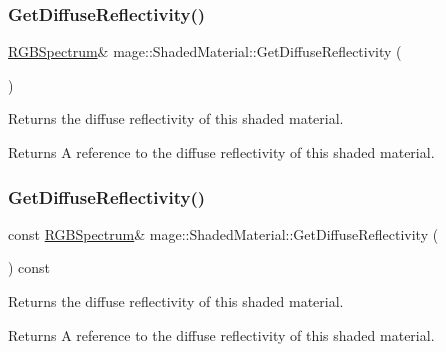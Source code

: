 \subsubsection{\texorpdfstring{Get\+Diffuse\+Reflectivity()}{GetDiffuseReflectivity()}\hspace{0.1cm}{\footnotesize\ttfamily [1/2]}}
{\footnotesize\ttfamily \hyperlink{structmage_1_1_r_g_b_spectrum}{R\+G\+B\+Spectrum}\& mage\+::\+Shaded\+Material\+::\+Get\+Diffuse\+Reflectivity (\begin{DoxyParamCaption}{ }\end{DoxyParamCaption})\hspace{0.3cm}{\ttfamily [noexcept]}}

Returns the diffuse reflectivity of this shaded material.

\begin{DoxyReturn}{Returns}
A reference to the diffuse reflectivity of this shaded material. 
\end{DoxyReturn}
\hypertarget{structmage_1_1_shaded_material_ae2c5d441c51b40a3c940785a002f59ec}{}\label{structmage_1_1_shaded_material_ae2c5d441c51b40a3c940785a002f59ec} 
\subsubsection{\texorpdfstring{Get\+Diffuse\+Reflectivity()}{GetDiffuseReflectivity()}\hspace{0.1cm}{\footnotesize\ttfamily [2/2]}}
{\footnotesize\ttfamily const \hyperlink{structmage_1_1_r_g_b_spectrum}{R\+G\+B\+Spectrum}\& mage\+::\+Shaded\+Material\+::\+Get\+Diffuse\+Reflectivity (\begin{DoxyParamCaption}{ }\end{DoxyParamCaption}) const\hspace{0.3cm}{\ttfamily [noexcept]}}

Returns the diffuse reflectivity of this shaded material.

\begin{DoxyReturn}{Returns}
A reference to the diffuse reflectivity of this shaded material. 
\end{DoxyReturn}
\hypertarget{structmage_1_1_shaded_material_a4e163bd276e41b01973a5d968f6f5716}{}\label{structmage_1_1_shaded_material_a4e163bd276e41b01973a5d968f6f5716} 
